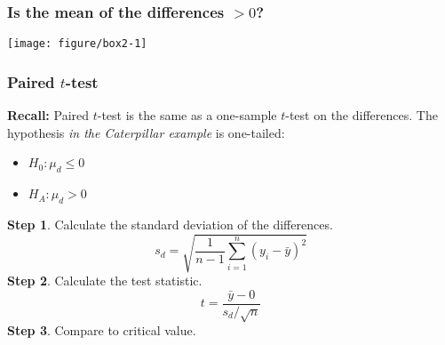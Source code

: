 \documentclass[color=usenames,dvipsnames]{beamer}\usepackage[]{graphicx}\usepackage[]{color}
\begin{document}
\begin{frame}[fragile]
  \frametitle{Is the mean of the differences $>0$?}
  \begin{center}
  \footnotesize

\vspace{-.2cm}
\texttt{[image: figure/box2-1]}
  \end{center}
\end{frame}



\begin{comment}
\begin{frame}[fragile]
  \frametitle{Is the mean of the differences $>0$?}
  \begin{center}
  \footnotesize
\texttt{[image: figure/pplot-1]}
  \end{center}
\end{frame}
\end{comment}



\begin{comment}
\begin{frame}[fragile]
  \frametitle{The differences}
\begin{center}
  \footnotesize

\texttt{[image: figure/diff-1]}
\end{center}
\end{frame}
\end{comment}






\begin{frame}[fragile]
  \frametitle{Paired $t$-test}
  {\bf Recall:} Paired $t$-test is the same as a one-sample $t$-test on the
      differences. The hypothesis \emph{in the Caterpillar example} is one-tailed:
  \begin{itemize}
    \item $H_0: \mu_d \le 0$
    \item $H_A: \mu_d > 0$
  \end{itemize}
  \pause
  \vfill
  \normalsize
  {\bf Step 1}. Calculate the standard deviation of the differences.
  \[
    s_d = \sqrt{\frac{1}{n-1} \sum_{i=1}^n
        (y_i - \bar{y})^2}%
  \]
  \pause
  \vfill
  {\bf Step 2}. Calculate the test statistic.
  \[
     t = \frac{\bar{y} - 0}{s_d/\sqrt{n}}
  \]
  {\bf Step 3}. Compare to critical value.
\end{frame}
\end{document}
